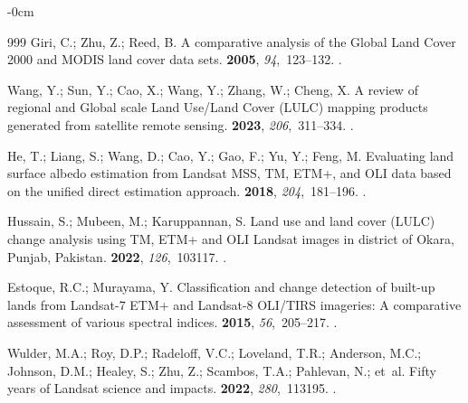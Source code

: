 \documentclass[coasts,article,accept,pdftex,oneauthor]{Definitions/mdpi}
\begin{document}
\begin{adjustwidth}{-\extralength}{0cm}
\begin{thebibliography}{999}
Giri, C.; Zhu, Z.; Reed, B.
\newblock A comparative analysis of the Global Land Cover 2000 and MODIS land
  cover data sets.
 {\bf 2005}, {\em 94},~123--132.
.

Wang, Y.; Sun, Y.; Cao, X.; Wang, Y.; Zhang, W.; Cheng, X.
\newblock A review of regional and Global scale Land Use/Land Cover (LULC)
  mapping products generated from satellite remote sensing.
 {\bf 2023},
  {\em 206},~311--334.
.

He, T.; Liang, S.; Wang, D.; Cao, Y.; Gao, F.; Yu, Y.; Feng, M.
\newblock Evaluating land surface albedo estimation from Landsat MSS, TM, ETM+,
  and OLI data based on the unified direct estimation approach.
 {\bf 2018}, {\em 204},~181--196.
.

Hussain, S.; Mubeen, M.; Karuppannan, S.
\newblock Land use and land cover (LULC) change analysis using TM, ETM+ and OLI
  Landsat images in district of Okara, Punjab, Pakistan.
 {\bf 2022},
  {\em 126},~103117.
.

Estoque, R.C.; Murayama, Y.
\newblock Classification and change detection of built-up lands from Landsat-7
  ETM+ and Landsat-8 OLI/TIRS imageries: A comparative assessment of various
  spectral indices.
 {\bf 2015}, {\em 56},~205--217.
.

Wulder, M.A.; Roy, D.P.; Radeloff, V.C.; Loveland, T.R.; Anderson, M.C.;
  Johnson, D.M.; Healey, S.; Zhu, Z.; Scambos, T.A.; Pahlevan, N.;  et~al.
\newblock Fifty years of Landsat science and impacts.
 {\bf 2022}, {\em 280},~113195.
.


\end{thebibliography}
\end{adjustwidth}
\end{document}
